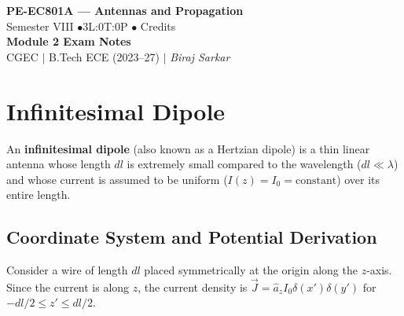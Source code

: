 \documentclass[12pt,a4paper]{article}
\begin{document}

\begin{center}
  {\LARGE\bfseries\color{myred} PE-EC801A --- Antennas and Propagation}\\[5pt]
  {\normalsize\color{mydark} Semester VIII \quad$\bullet$\quad 3L:0T:0P \quad$\bullet$ Credits}\\[3pt]
  {\normalsize\color{myteal}\textbf{Module 2 Exam Notes}}\\[3pt]
  {\small\color{mydark} CGEC \;$|$\; B.Tech ECE (2023--27) \;$|$\; \textit{Biraj Sarkar}}
\end{center}
\vspace{2pt}
\noindent{\color{myred}\rule{\linewidth}{1.5pt}}
\vspace{2pt}

\hypersetup{linkcolor=mydark}
\tableofcontents
\hypersetup{linkcolor=myteal}
\newpage

\section{Infinitesimal Dipole}

\begin{tcolorbox}[defbox, title={\textbf{Definition of Infinitesimal Dipole}}]
An \textbf{infinitesimal dipole} (also known as a Hertzian dipole) is a thin linear antenna whose length $dl$ is extremely small compared to the wavelength ($dl \ll \lambda$) and whose current is assumed to be uniform ($I(z) = I_0 = \text{constant}$) over its entire length.
\end{tcolorbox}

\subsection{Coordinate System and Potential Derivation}
Consider a wire of length $dl$ placed symmetrically at the origin along the $z$-axis. Since the current is along $z$, the current density is $\vec{J} = \hat{a}_z I_0 \delta(x')\delta(y')$ for $-dl/2 \le z' \le dl/2$. 
\end{document}
